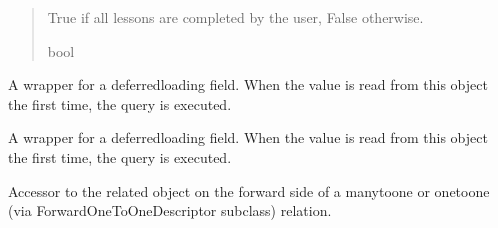 \documentclass[letterpaper,10pt,english]{sphinxmanual}
\begin{document}
\begin{fulllineitems}
\begin{fulllineitems}
\begin{quote}
\begin{description}
\sphinxAtStartPar
True if all lessons are completed by the user, False otherwise.

\sphinxAtStartPar
bool

\end{description}\end{quote}

\end{fulllineitems}


\begin{fulllineitems}
\label{\detokenize{courses:id18}}
\pysigstartsignatures
\pysigline
{}
\pysigstopsignatures
\sphinxAtStartPar
A wrapper for a deferred\sphinxhyphen{}loading field. When the value is read from this
object the first time, the query is executed.

\end{fulllineitems}


\begin{fulllineitems}
\label{\detokenize{courses:courses.models.Theme.objects}}
\pysigstartsignatures
\pysigline
{}
\pysigstopsignatures
\end{fulllineitems}


\begin{fulllineitems}
\label{\detokenize{courses:courses.models.Theme.updated_at}}
\pysigstartsignatures
\pysigline
{}
\pysigstopsignatures
\sphinxAtStartPar
A wrapper for a deferred\sphinxhyphen{}loading field. When the value is read from this
object the first time, the query is executed.

\end{fulllineitems}


\begin{fulllineitems}
\label{\detokenize{courses:courses.models.Theme.updated_by}}
\pysigstartsignatures
\pysigline
{}
\pysigstopsignatures
\sphinxAtStartPar
Accessor to the related object on the forward side of a many\sphinxhyphen{}to\sphinxhyphen{}one or
one\sphinxhyphen{}to\sphinxhyphen{}one (via ForwardOneToOneDescriptor subclass) relation.


\end{fulllineitems}
\end{fulllineitems}
\end{document}

